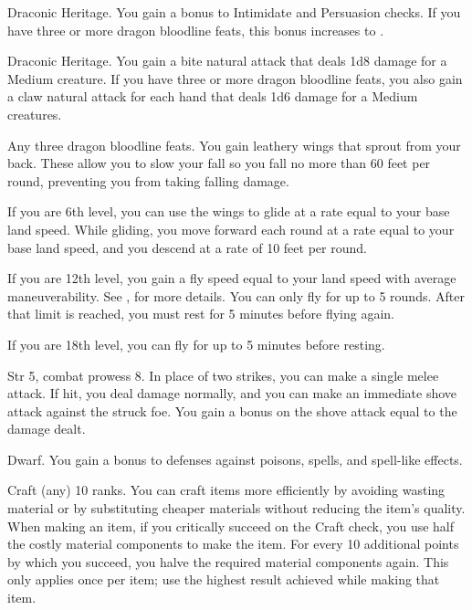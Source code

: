 \featpre Draconic Heritage.
\featben You gain a  bonus to Intimidate and Persuasion checks.
If you have three or more dragon bloodline feats, this bonus increases to .

\featpre Draconic Heritage.
\featben You gain a bite natural attack that deals 1d8 damage for a Medium creature.
If you have three or more dragon bloodline feats, you also gain a claw natural attack for each hand that deals 1d6 damage for a Medium creatures.

\featpre Any three dragon bloodline feats.
\featben You gain leathery wings that sprout from your back.
These allow you to slow your fall so you fall no more than 60 feet per round, preventing you from taking falling damage.

If you are 6th level, you can use the wings to glide at a rate equal to your base land speed.
While gliding, you move forward each round at a rate equal to your base land speed, and you descend at a rate of 10 feet per round.

If you are 12th level, you gain a fly speed equal to your land speed with average maneuverability.
See , for more details.
You can only fly for up to 5 rounds.
After that limit is reached, you must rest for 5 minutes before flying again.

If you are 18th level, you can fly for up to 5 minutes before resting.

\featpres Str 5, combat prowess 8.
\featben In place of two strikes, you can make a single melee attack.
If hit, you deal damage normally, and you can make an immediate shove attack against the struck foe.
You gain a bonus on the shove attack equal to the damage dealt.

\featpre Dwarf.
\featben You gain a  bonus to defenses against poisons, spells, and spell-like effects.

\featpre Craft (any) 10 ranks.
\featben You can craft items more efficiently by avoiding wasting material or by substituting cheaper materials without reducing the item's quality.
When making an item, if you critically succeed on the Craft check, you use half the costly material components to make the item.
For every 10 additional points by which you succeed, you halve the required material components again.
This only applies once per item; use the highest result achieved while making that item.

